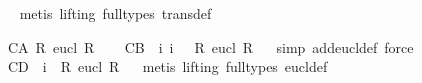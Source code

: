\begin{isabellebody}
\isadelimproof
\ %
\endisadelimproof
%
\isatagproof
{}\isamarkupfalse%
\ {\isacharparenleft}metis\ {\isacharparenleft}lifting{\isacharcomma}\ full{\isacharunderscore}types{\isacharparenright}\ trans{\isacharunderscore}def{\isacharparenright}%
\endisatagproof
{\isafoldproof}%
%
\isadelimproof
%
\endisadelimproof
%
\begin{isamarkuptext}%
\begin{isbfig}{7em}
\end{isbfig}%
\end{isamarkuptext}%
\isamarkuptrue%
%
\isamarkuptrue%
\isamarkupfalse%
\ C{}{\isacharunderscore}A{\isacharcolon}\ {\isachardoublequoteopen}{\isasymforall}R{\isachardot}\ eucl\ R{\isachardoublequoteclose}\ \isamarkupfalse%
%
\isadelimproof
\ %
\endisadelimproof
%
\isatagproof
{}\isamarkupfalse%
%
\endisatagproof
{\isafoldproof}%
%
\isadelimproof
%
\endisadelimproof
\isanewline
{}\isamarkupfalse%
\ C{}{\isacharunderscore}B{\isacharcolon}\ {\isachardoublequoteopen}{\isacharhash}\ i{}\ i{}\ {\isasymlongrightarrow}\ {\isasymnot}\ {\isacharparenleft}{\isasymforall}R{\isachardot}\ eucl\ R{\isacharparenright}{\isachardoublequoteclose}%
\isadelimproof
\ %
\endisadelimproof
%
\isatagproof
{}\isamarkupfalse%
\ {\isacharparenleft}simp\ add{\isacharcolon}eucl{\isacharunderscore}def{\isacharcomma}\ force{\isacharparenright}%
\endisatagproof
{\isafoldproof}%
%
\isadelimproof
%
\endisadelimproof
\isanewline
{}\isamarkupfalse%
\ C{}{\isacharunderscore}D{\isacharcolon}\ {\isachardoublequoteopen}{\isacharhash}\ i{}\ {\isasymlongrightarrow}\ {\isacharparenleft}{\isasymforall}R{\isachardot}\ eucl\ R{\isacharparenright}{\isachardoublequoteclose}%
\isadelimproof
\ %
\endisadelimproof
%
\isatagproof
{}\isamarkupfalse%
\ {\isacharparenleft}metis\ {\isacharparenleft}lifting{\isacharcomma}\ full{\isacharunderscore}types{\isacharparenright}\ eucl{\isacharunderscore}def{\isacharparenright}%
\endisatagproof
{\isafoldproof}%
%
\isadelimproof
%
\endisadelimproof

\end{isabellebody}
